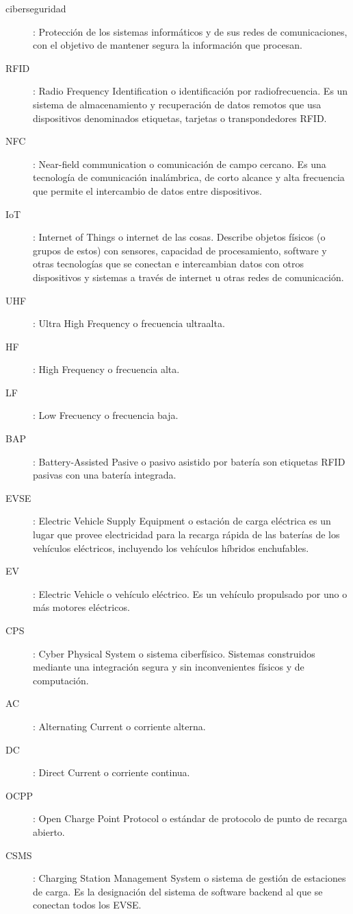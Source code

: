 \documentclass[12pt,a4paper,onecolumn,oneside]{report}
\begin{document}
\begin{description}
	
	\item[ciberseguridad]: Protección de los sistemas informáticos y de sus redes de comunicaciones, con el objetivo de mantener segura la información que procesan.	
	\item[RFID]: Radio Frequency Identification o identificación por radiofrecuencia. Es un sistema de almacenamiento y recuperación de datos remotos que usa dispositivos denominados etiquetas, tarjetas o transpondedores RFID.
	\item[NFC]: Near-field communication o comunicación de campo cercano. Es una tecnología de comunicación inalámbrica, de corto alcance y alta frecuencia que permite el intercambio de datos entre dispositivos.
	\item[IoT]: Internet of Things o internet de las cosas. Describe objetos físicos (o grupos de estos) con sensores, capacidad de procesamiento, software y otras tecnologías que se conectan e intercambian datos con otros dispositivos y sistemas a través de internet u otras redes de comunicación.
	\item[UHF]: Ultra High Frequency o frecuencia ultraalta.
	\item[HF]: High Frequency o frecuencia alta.
	\item[LF]: Low Frecuency o frecuencia baja.
	\item[BAP]: Battery-Assisted Pasive o pasivo asistido por batería son etiquetas RFID pasivas con una batería integrada.
	\item[EVSE]: Electric Vehicle Supply Equipment o estación de carga eléctrica es un lugar que provee electricidad para la recarga rápida de las baterías de los vehículos eléctricos, incluyendo los vehículos híbridos enchufables.
	\item[EV]: Electric Vehicle o vehículo eléctrico. Es un vehículo propulsado por uno o más motores eléctricos.
	\item[CPS]: Cyber Physical System o sistema ciberfísico. Sistemas construidos mediante una integración segura y sin inconvenientes físicos y de computación.
	\item[AC]: Alternating Current o corriente alterna.
	\item[DC]: Direct Current o corriente continua.
	\item[OCPP]: Open Charge Point Protocol o estándar de protocolo de punto de recarga abierto.
	\item[CSMS]: Charging Station Management System o sistema de gestión de estaciones de carga. Es la designación del sistema de software backend al que se conectan todos los EVSE.

\end{description}
\end{document}
